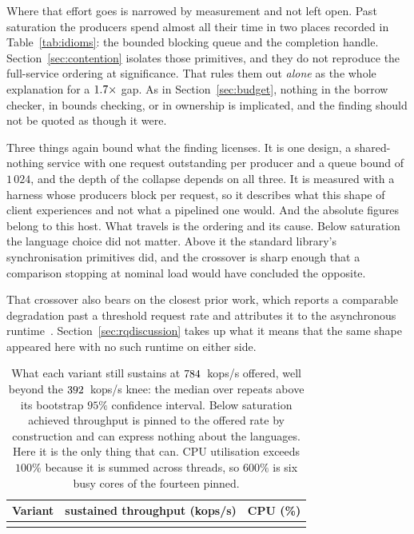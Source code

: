 \documentclass[english,oneside,a4paper,censored,csm,software-track-2020]{HYthesisML}
\begin{document}
Where that effort goes is narrowed by measurement and not left open. Past
saturation the producers spend almost all their time in two places recorded in
Table~\ref{tab:idioms}: the bounded blocking queue and the completion handle.
Section~\ref{sec:contention} isolates those primitives, and they do not reproduce the
full-service ordering at significance. That rules them out \emph{alone} as the whole explanation
for a $1.7\times$ gap. As in Section~\ref{sec:budget}, nothing in the borrow checker,
in bounds checking, or in ownership is implicated, and the finding should not be quoted as though
it were.

Three things again bound what the finding licenses. It is one design, a shared-nothing service with one
request outstanding per producer and a queue bound of $1\,024$, and the depth of the collapse
depends on all three. It is measured with a harness whose producers block per request, so it
describes what this shape of client experiences and not what a pipelined one would.
And the absolute figures belong to this host. What travels is the ordering and its cause. Below
saturation the language choice did not matter. Above it the standard library's synchronisation
primitives did, and the crossover is sharp enough that a comparison stopping at nominal load
would have concluded the opposite.

That crossover also bears on the closest prior work, which reports a comparable degradation past
a threshold request rate and attributes it to the asynchronous
runtime~\cite{arvidsson2025async}. Section~\ref{sec:rqdiscussion} takes up what it means that the
same shape appeared here with no such runtime on either side.

\begin{table}[H]
\centering
\small
\caption[What each variant sustains past saturation]{What each variant still sustains at
$784$~kops/s offered, well beyond the $392$~kops/s knee: the median over
\NRepeats{} repeats above its bootstrap $95\%$ confidence interval. Below saturation achieved
throughput is pinned to the offered rate by construction and can express nothing about the
languages. Here it is the only thing that can. CPU utilisation exceeds $100\%$ because it is
summed across threads, so $600\%$ is six busy cores of the fourteen
pinned.\label{tab:overload}}
\begin{tabular}{@{}l r r@{}}
\hline\hline
Variant & sustained throughput (kops/s) & CPU (\%) \\
\hline
\\
\hline
\end{tabular}
\end{table}
\end{document}
